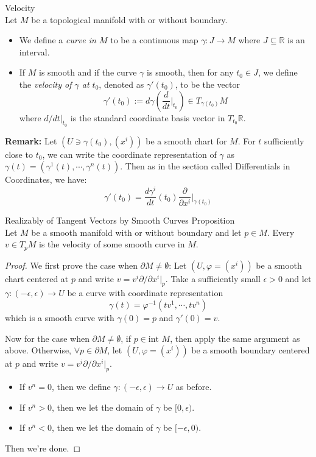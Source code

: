 \begin{definition}{Velocity}\\
Let $M$ be a topological manifold with or without boundary. 
\begin{itemize}
    \item We define a \textit{curve in $M$} to be a continuous map $\gamma: J\to M$ where $J\subseteq \mathbb{R}$ is an interval.
    \item If $M$ is smooth and if the curve $\gamma$ is smooth, then for any $t_0\in J$, we define the \textit{velocity of $\gamma$ at $t_0$}, denoted as $\gamma'(t_0)$, to be the vector
    \[
    \gamma'(t_0):= d\gamma(\frac{d}{dt}|_{t_0}) \in T_{\gamma(t_0)} M
    \]
    where $d/dt|_{t_0}$ is the standard coordinate basis vector in $T_{t_0}\mathbb{R}$.
\end{itemize}
\end{definition}

\noindent\textbf{Remark:} Let $(U\ni \gamma(t_0), (x^i))$ be a smooth chart for $M$. For $t$ sufficiently close to $t_0$, we can write the coordinate representation of $\gamma$ as $\gamma(t)= (\gamma^1(t), \cdots, \gamma^n(t))$. Then as in the section called Differentials in Coordinates, we have:
\[
\gamma'(t_0)= \frac{d\gamma^i}{dt} (t_0) \frac{\partial}{\partial x^i}|_{\gamma(t_0)}
\]

\begin{proposition}{Realizably of Tangent Vectors by Smooth Curves Proposition}\\
Let $M$ be a smooth manifold with or without boundary and let $p\in M$. Every $v\in T_pM$ is the velocity of some smooth curve in $M$.
\end{proposition}

\begin{proof}
    We first prove the case when $\partial M\neq \emptyset$: Let $(U,\varphi=(x^i))$ be a smooth chart centered at $p$ and write $v=v^i \partial/ \partial x^i|_p$. Take a sufficiently small $\epsilon>0$ and let $\gamma: (-\epsilon,\epsilon) \to U$ be a curve with coordinate representation
    \[
    \gamma(t)= \varphi^{-1} (tv^1, \cdots, tv^n)
    \]
    which is a smooth curve with $\gamma(0)=p$ and $\gamma'(0)=v$.

    Now for the case when $\partial M\neq \emptyset$, if $p\in \text{int }M$, then apply the same argument as above. Otherwise, $\forall p\in \partial M$, let $(U,\varphi=(x^i))$ be a smooth boundary centered at $p$ and write $v= v^i \partial/ \partial x^i|_p$.
    \begin{itemize}
        \item If $v^n=0$, then we define $\gamma:(-\epsilon,\epsilon) \to U$ as before.
        \item If $v^n>0$, then we let the domain of $\gamma$ be $[0,\epsilon)$.
        \item If $v^n<0$, then we let the domain of $\gamma$ be $[-\epsilon,0)$.
    \end{itemize}
    Then we're done.
\end{proof}

